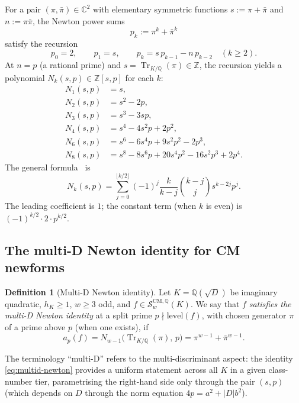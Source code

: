 \documentclass[11pt,a4paper]{amsart}
\theoremstyle{definition}
\newtheorem{definition}[theorem]{Definition}
\DeclareMathOperator{\Tr}{Tr}
\newcommand{\Q}{\mathbb{Q}}
\newcommand{\Z}{\mathbb{Z}}
\newcommand{\C}{\mathbb{C}}
\newcommand{\Scal}{\mathcal{S}}
\newcommand{\hK}{h_{K}}
\begin{document}
For a pair $(\pi, \bar\pi) \in \C^2$ with elementary symmetric functions $s := \pi + \bar\pi$ and $n := \pi \bar\pi$, the Newton power sums
\[
p_k := \pi^k + \bar\pi^k
\]
satisfy the recursion
\begin{equation}\label{eq:newton-recursion}
p_0 = 2, \qquad p_1 = s, \qquad p_k = s \, p_{k-1} - n \, p_{k-2} \quad (k \ge 2).
\end{equation}
At $n = p$ (a rational prime) and $s = \Tr_{K/\Q}(\pi) \in \Z$, the recursion yields a polynomial $N_{k}(s, p) \in \Z[s, p]$ for each $k$:
\begin{align}
N_1(s, p) &= s, \nonumber\\
N_2(s, p) &= s^2 - 2p, \nonumber\\
N_3(s, p) &= s^3 - 3sp, \nonumber\\
N_4(s, p) &= s^4 - 4 s^2 p + 2 p^2, \nonumber\\
N_6(s, p) &= s^6 - 6 s^4 p + 9 s^2 p^2 - 2 p^3, \nonumber\\
N_8(s, p) &= s^8 - 8 s^6 p + 20 s^4 p^2 - 16 s^2 p^3 + 2 p^4. \label{eq:Nk-polys}
\end{align}
The general formula~\cite[\S1.7]{Macdonald1995} is
\begin{equation}\label{eq:Nk-general}
N_k(s, p) = \sum_{j = 0}^{\lfloor k/2 \rfloor} (-1)^j \frac{k}{k-j} \binom{k-j}{j} s^{k-2j} p^j.
\end{equation}
The leading coefficient is $1$; the constant term (when $k$ is even) is $(-1)^{k/2} \cdot 2 \cdot p^{k/2}$.

\subsection{The multi-D Newton identity for CM newforms}\label{sec:multid-newton}

\begin{definition}[Multi-D Newton identity]\label{def:multiD-newton}
Let $K = \Q(\sqrt{D})$ be imaginary quadratic, $\hK \ge 1$, $w \ge 3$ odd, and $f \in \Scal_w^{\mathrm{CM},\Q}(K)$. We say that $f$ \emph{satisfies the multi-D Newton identity} at a split prime $p \nmid \mathrm{level}(f)$, with chosen generator $\pi$ of a prime above $p$ (when one exists), if
\begin{equation}\label{eq:multid-newton}
a_p(f) = N_{w-1}\bigl(\Tr_{K/\Q}(\pi), \, p\bigr) = \pi^{w-1} + \bar\pi^{w-1}.
\end{equation}
\end{definition}

The terminology ``multi-D'' refers to the multi-discriminant aspect: the identity \eqref{eq:multid-newton} provides a uniform statement across all $K$ in a given class-number tier, parametrising the right-hand side only through the pair $(s, p)$ (which depends on $D$ through the norm equation $4p = a^2 + |D| b^2$).
\end{document}
